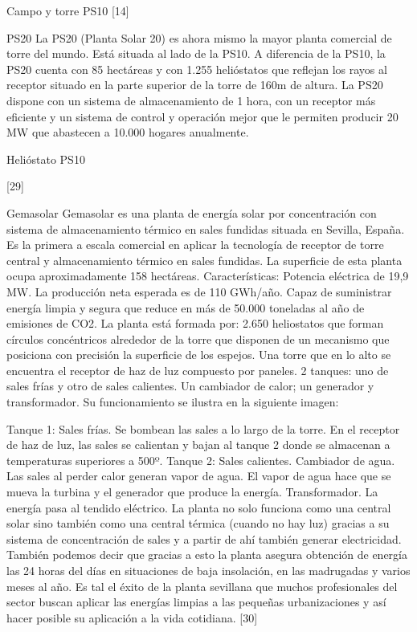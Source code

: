 \documentclass[12pt]{article}
\begin{document}
Campo y torre PS10
[14]



PS20
La PS20 (Planta Solar 20) es ahora mismo la mayor planta comercial de torre del mundo. Está situada al lado de la PS10.
A diferencia de la PS10, la PS20 cuenta con 85 hectáreas y con 1.255 helióstatos que reflejan los rayos al receptor situado en la parte superior de la torre de 160m de altura.
La PS20 dispone con un sistema de almacenamiento de 1 hora, con un receptor más eficiente y un sistema de control y operación mejor que le permiten producir 20 MW que abastecen a 10.000 hogares anualmente.

Helióstato PS10

[29]

Gemasolar
Gemasolar es una planta de energía solar por concentración con sistema de almacenamiento térmico en sales fundidas situada en Sevilla, España. Es la primera a escala comercial en aplicar la tecnología de receptor de torre central y almacenamiento térmico en sales fundidas. La superficie de esta planta ocupa aproximadamente 158 hectáreas. Características:
Potencia eléctrica de 19,9 MW.
La producción neta esperada es de 110 GWh/año.
Capaz de suministrar energía limpia y segura que reduce en más de 50.000 toneladas al año de emisiones de CO2.
La planta está formada por:
2.650 heliostatos que forman círculos concéntricos alrededor de la torre que disponen de un mecanismo que posiciona con precisión la superficie de los espejos.
Una torre que en lo alto se encuentra el receptor de haz de luz compuesto por paneles.
2 tanques: uno de sales frías y otro de sales calientes.
Un cambiador de calor; un generador y transformador.
Su funcionamiento se ilustra en la siguiente imagen:

Tanque 1: Sales frías.
Se bombean las sales a lo largo de la torre.
En el receptor de haz de luz, las sales se calientan y bajan al tanque 2 donde se almacenan a temperaturas superiores a 500º.
Tanque 2: Sales calientes.
Cambiador de agua.
Las sales al perder calor generan vapor de agua.
El vapor de agua hace que se mueva la turbina y el generador que produce la energía.
Transformador. La energía pasa al tendido eléctrico.
La planta no solo funciona como una central solar sino también como una central térmica (cuando no hay luz) gracias a su sistema de concentración de sales y a partir de ahí también generar electricidad. También podemos decir que gracias a esto la planta asegura obtención de energía las 24 horas del días en situaciones de baja insolación, en las madrugadas y varios meses al año.
Es tal el éxito de la planta sevillana que muchos profesionales del sector buscan aplicar las energías limpias a las pequeñas urbanizaciones y así hacer posible su aplicación a la vida cotidiana. [30]
\end{document}
